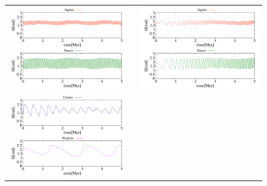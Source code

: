 \documentclass[11pt,a4paper,oneside,onecolumn]{jreport}
\begin{document}
\begin{figure}[H]
\begin{tabular}{ccc}
\begin{minipage}[t]{0.45\hsize}
\centering
\includegraphics[width=8cm]{./image/NoMove_capitalOMEGA_5Myr_JUPSAT.pdf}
\end{minipage} &
\begin{minipage}[t]{0.1\hsize}
\end{minipage} &
\begin{minipage}[t]{0.45\hsize}
\centering
\includegraphics[width=8cm]{./image/Move500kyr_capitalOMEGA_5Myr_JUPSAT.pdf}
\end{minipage}\\
\begin{minipage}[t]{0.45\hsize}
\centering
\includegraphics[width=8cm]{./image/NoMove_capitalOMEGA_5Myr_URANEP.pdf}
\end{minipage} &

\end{tabular}
\end{figure}
\end{document}
